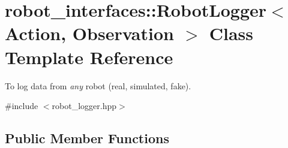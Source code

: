 \hypertarget{classrobot__interfaces_1_1RobotLogger}{}\section{robot\+\_\+interfaces\+:\+:Robot\+Logger$<$ Action, Observation $>$ Class Template Reference}
\label{classrobot__interfaces_1_1RobotLogger}


To log data from {\itshape any} robot (real, simulated, fake).  




{\ttfamily \#include $<$robot\+\_\+logger.\+hpp$>$}

\subsection*{Public Member Functions}
